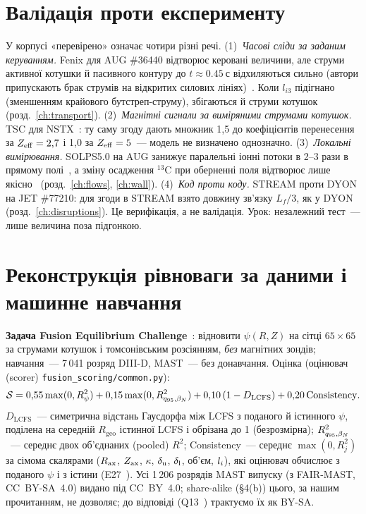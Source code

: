 \section{Валідація проти експерименту}\label{sec:11-validation}

У корпусі «перевірено» означає чотири різні речі.
(1)~\emph{Часові сліди за заданим керуванням.} Fenix для AUG \#36440 відтворює керовані величини, але струми активної котушки й пасивного контуру до $t\approx\SI{0,45}{с}$ відхиляються сильно (автори припускають брак струмів на відкритих силових лініях)~\cite[с.~5]{Fable2022}. Коли $l_{i3}$ підігнано (зменшенням крайового бутстреп-струму), збігаються й струми котушок~\cite[с.~6--7]{Fable2022} (розд.~\ref{ch:transport}).
(2)~\emph{Магнітні сигнали за виміряними струмами котушок.} TSC для NSTX~\cite[с.~3--4]{Jardin2000}: ту саму згоду дають множник 1,5 до коефіцієнтів перенесення за $Z_{\mathrm{eff}}=2{,}7$ і 1,0 за $Z_{\mathrm{eff}}=5$~--- модель не визначено однозначно.
(3)~\emph{Локальні вимірювання.} SOLPS5.0 на AUG занижує паралельні іонні потоки в 2--3 рази в прямому полі~\cite[с.~61]{AhoMantila2011}, а зміну осадження $^{13}$C при оберненні поля відтворює лише якісно~\cite[с.~63]{AhoMantila2011} (розд.~\ref{ch:flows}, \ref{ch:wall}).
(4)~\emph{Код проти коду.} STREAM проти DYON на JET \#77210: для згоди в STREAM взято довжину зв'язку $L_f/3$, як у DYON~\cite[с.~13, 15]{Hoppe2022} (розд.~\ref{ch:disruptions}). Це верифікація, а не валідація.
Урок: незалежний тест~--- лише величина поза підгонкою.

\section{Реконструкція рівноваги за даними і машинне навчання}\label{sec:11-ml}

\textbf{Задача Fusion Equilibrium Challenge}~\cite{FEC2026}: відновити $\psi(R,Z)$ на сітці $65\times65$ за струмами котушок і томсонівським розсіянням, \emph{без} магнітних зондів; навчання~--- 7\,041 розряд DIII-D, MAST~--- без донавчання. Оцінка (оцінювач (scorer) \texttt{fusion\_scoring/common.py}):
\begin{equation}\label{eq:11-score}
\mathcal S=0{,}55\max(0,R^2_\psi)+0{,}15\max(0,R^2_{q_{95},\beta_{N}})+0{,}10\,(1-D_{\mathrm{LCFS}})+0{,}20\,\mathrm{Consistency}.
\end{equation}
$D_{\mathrm{LCFS}}$~--- симетрична відстань Гаусдорфа між LCFS з поданого й істинного $\psi$, поділена на середній $R_{\mathrm{geo}}$ істинної LCFS і обрізана до 1 (безрозмірна); $R^2_{q_{95},\beta_{N}}$~--- середнє двох об'єднаних (pooled) $R^2$; Consistency~--- середнє $\max(0,R^2_j)$ за сімома скалярами ($R_{\mathrm{ax}}$, $Z_{\mathrm{ax}}$, $\kappa$, $\delta_{\mathrm{u}}$, $\delta_{\mathrm{l}}$, об'єм, $l_{i}$), які оцінювач обчислює з поданого $\psi$ і з істини (E27~\cite{ProjRegisters}). Усі 1\,206 розрядів MAST випуску (з FAIR-MAST, CC~BY-SA~4.0) видано під CC~BY~4.0; share-alike (§4(b)) цього, за нашим прочитанням, не дозволяє; до відповіді (Q13~\cite{ProjRegisters}) трактуємо їх як BY-SA.

